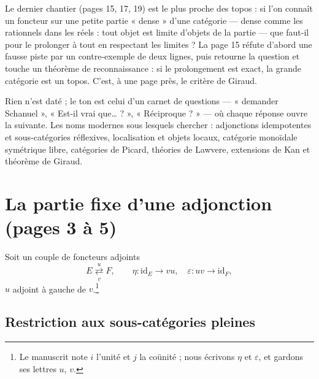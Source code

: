 \documentclass[11pt,a4paper]{article}
\begin{document}
\begin{resume}
Le dernier chantier (pages 15, 17, 19) est le plus proche des topos :
si l'on connaît un foncteur sur une petite partie « dense » d'une catégorie
— dense comme les rationnels dans les réels : tout objet est limite
d'objets de la partie — que faut-il pour le prolonger à tout en respectant
les limites ? La page 15 réfute d'abord une fausse piste par un
contre-exemple de deux lignes, puis retourne la question et touche un
théorème de reconnaissance : si le prolongement est exact, la grande
catégorie est un topos. C'est, à une page près, le critère de Giraud.

Rien n'est daté ; le ton est celui d'un carnet de questions — « demander
Schanuel », « Est-il vrai que… ? », « Réciproque ? » — où chaque réponse
ouvre la suivante. Les noms modernes sous lesquels chercher : adjonctions
idempotentes et sous-catégories réflexives, localisation et objets locaux,
catégorie monoïdale symétrique libre, catégories de Picard, théories de
Lawvere, extensions de Kan et théorème de Giraud.

\end{resume}

\section*{La partie fixe d'une adjonction (pages 3 à 5)}

Soit un couple de foncteurs adjoints
\[
E \underset{v}{\overset{u}{\rightleftarrows}} F,
\qquad \eta : \mathrm{id}_E \to vu, \quad \varepsilon : uv \to \mathrm{id}_F,
\]
$u$ adjoint à gauche de $v$.\footnote{Le manuscrit note $i$ l'unité et $j$
la coünité ; nous écrivons $\eta$ et $\varepsilon$, et gardons ses lettres
$u$, $v$.}

\subsection*{Restriction aux sous-catégories pleines}
\end{document}
